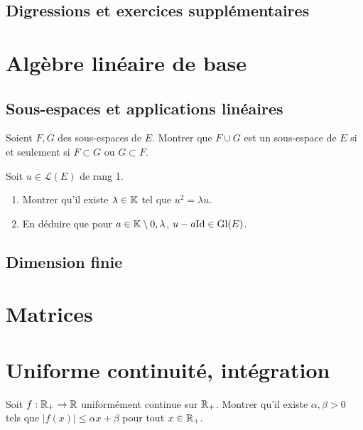 \documentclass[12pt,a4paper]{exo_book}
\begin{document}
\section{Digressions et exercices supplémentaires}

\chapter{Algèbre linéaire de base}

\section{Sous-espaces et applications linéaires}

\begin{exo}
    Soient $F,G$ des sous-espaces de $E$. Montrer que $F \cup G$ est un sous-espace de $E$ si et seulement si $F \subset G$ ou $G \subset F$.
\end{exo}

\begin{exo}
    Soit $u\in \mathcal{L}(E)$ de rang 1.
    \begin{enumerate}
        \item Montrer qu'il existe $\lambda \in \mathbb{K}$ tel que $u^2 = \lambda u$.
        \item En déduire que pour $a \in \mathbb{K} \setminus {0,\lambda}$, $u - a \mathrm{Id} \in \operatorname{Gl}(E)$.
    \end{enumerate}
\end{exo}

\section{Dimension finie}

\chapter{Matrices}

\chapter{Uniforme continuité, intégration}

\begin{exo}
    Soit $f : \mathbb{R}_+ \to \mathbb{R}$ uniformément continue sur $\mathbb{R}_+$. Montrer qu'il existe $\alpha,\beta > 0$ tels que $|f(x)| \le \alpha x + \beta$ pour tout $x \in \mathbb{R}_+$.
\end{exo}
\end{document}
